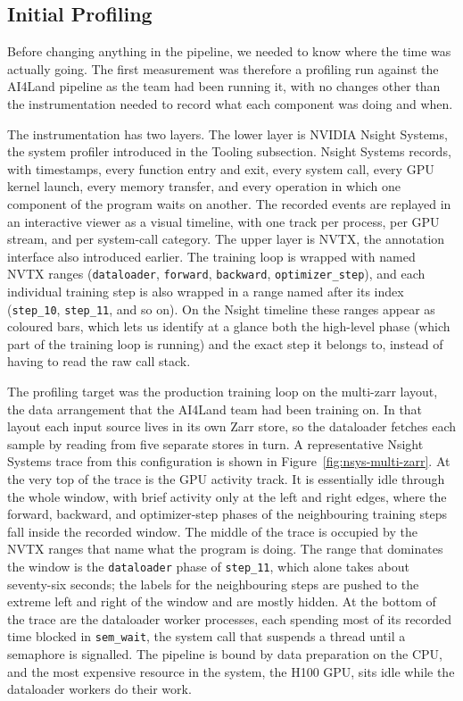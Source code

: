 \documentclass[12pt,a4paper]{article}
\begin{document}
\subsection{Initial Profiling}

Before changing anything in the pipeline, we needed to know where the time was actually
going. The first measurement was therefore a profiling run against the AI4Land pipeline as
the team had been running it, with no changes other than the instrumentation needed to record
what each component was doing and when.

The instrumentation has two layers. The lower layer is NVIDIA Nsight Systems, the system
profiler introduced in the Tooling subsection. Nsight Systems records, with timestamps, every
function entry and exit, every system call, every GPU kernel launch, every memory transfer,
and every operation in which one component of the program waits on another. The recorded
events are replayed in an interactive viewer as a visual timeline, with one track per
process, per GPU stream, and per system-call category. The upper layer is NVTX, the
annotation interface also introduced earlier. The training loop is wrapped with named NVTX
ranges (\texttt{dataloader}, \texttt{forward}, \texttt{backward},
\texttt{optimizer\_step}), and each individual training step is also wrapped in a range
named after its index (\texttt{step\_10}, \texttt{step\_11}, and so on). On the Nsight
timeline these ranges appear as coloured bars, which lets us identify at a glance both the
high-level phase (which part of the training loop is running) and the exact step it belongs
to, instead of having to read the raw call stack.

The profiling target was the production training loop on the multi-zarr layout, the data
arrangement that the AI4Land team had been training on. In that layout each input source
lives in its own Zarr store, so the dataloader fetches each sample by reading from five
separate stores in turn. A representative Nsight Systems trace from this configuration is
shown in Figure~\ref{fig:nsys-multi-zarr}. At the very top of the trace is the GPU activity
track. It is essentially idle through the whole window, with brief activity only at the left
and right edges, where the forward, backward, and optimizer-step phases of the neighbouring
training steps fall inside the recorded window. The middle of the trace is occupied by the
NVTX ranges that name what the program is doing. The range that dominates the window is the
\texttt{dataloader} phase of \texttt{step\_11}, which alone takes about seventy-six seconds;
the labels for the neighbouring steps are pushed to the extreme left and right of the window
and are mostly hidden. At the bottom of the trace are the dataloader worker processes, each
spending most of its recorded time blocked in \texttt{sem\_wait}, the system call that
suspends a thread until a semaphore is signalled. The pipeline is bound by data preparation on
the CPU, and the most expensive resource in the system, the H100 GPU, sits idle while the
dataloader workers do their work.
\end{document}
